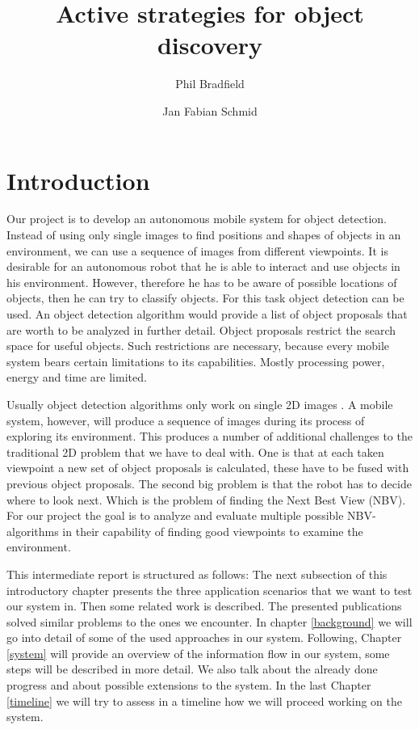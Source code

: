 \documentclass[a4paper,11pt,english]{article}
\begin{document}
\title{Active strategies for object discovery}
\author{Phil Bradfield \and Jan Fabian Schmid}
	
\maketitle 

\section{Introduction}
Our project is to develop an autonomous mobile system for object detection.
Instead of using only single images to find positions and shapes of objects in an environment, we can use a sequence of images from different viewpoints.
It is desirable for an autonomous robot that he is able to interact and use objects in his environment. However, therefore he has to be aware of possible locations of objects, then he can try to classify objects.
For this task object detection can be used. An object detection algorithm would provide a list of object proposals that are worth to be analyzed in further detail.
Object proposals restrict the search space for useful objects.
Such restrictions are necessary, because every mobile system bears certain limitations to its capabilities. 
Mostly processing power, energy and time are limited.

Usually object detection algorithms only work on single 2D images \cite{atanasov2014nonmyopic}.
A mobile system, however, will produce a sequence of images during its process of exploring its environment.
This produces a number of additional challenges to the traditional 2D problem that we have to deal with.
One is that at each taken viewpoint a new set of object proposals is calculated, these have to be fused with previous object proposals. The second big problem is that the robot has to decide where to look next. Which is the problem of finding the Next Best View (NBV). 
For our project the goal is to analyze and evaluate multiple possible NBV-algorithms in their capability of finding good viewpoints to examine the environment.\medskip

This intermediate report is structured as follows:
The next subsection of this introductory chapter presents the three application scenarios that we want to test our system in.
Then some related work is described. The presented publications solved similar problems to the ones we encounter.
In chapter \ref{background} we will go into detail of some of the used approaches in our system.
Following, Chapter \ref{system} will provide an overview of the information flow in our system, some steps will be described in more detail. We also talk about the already done progress and about possible extensions to the system.
In the last Chapter \ref{timeline} we will try to assess in a timeline how we will proceed working on the system. 
 
\end{document}
